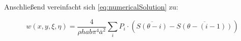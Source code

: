 Anschließend vereinfacht sich \ref{eq:numericalSolution} zu:

\begin{equation}
w(x,y,\xi, \eta) = \frac{4}{\rho h a b \pi^4 \overline{a}^2} \sum_i P_i \cdot (\overline{S(\theta - i)} - \overline{S(\theta - (i-1))})
\end{equation}




